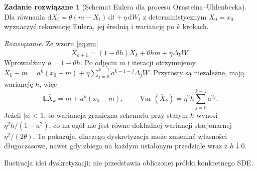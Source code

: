 \documentclass[11pt,a4paper,oneside]{report}
\numberwithin{equation}{chapter}
\theoremstyle{plain}
\theoremstyle{definition}
\newtheorem{zadanie}{Zadanie rozwiązane}[chapter]
\theoremstyle{remark}
\newcommand{\E}{\mathbb{E}}
\newcommand{\Var}{\operatorname{Var}}
\newcommand{\dd}{\mathrm{d}}
\begin{document}
\begin{zadanie}[Schemat Eulera dla procesu Ornsteina--Uhlenbecka]
Dla równania $\dd X_t=\theta(m-X_t)\,\dd t+\eta\,\dd W_t$
z deterministycznym $X_0=x_0$ wyznaczyć rekurencję
Eulera, jej średnią i wariancję po $k$ krokach.

\emph{Rozwiązanie.} Ze wzoru \eqref{eq:em}
\[
\bar X_{k+1}=(1-\theta h)\bar X_k+\theta hm
+\eta\Delta_kW.
\]
Wprowadźmy $a=1-\theta h$. Po odjęciu $m$
i iteracji otrzymujemy
$\bar X_k-m=a^k(x_0-m)+\eta\sum_{j=0}^{k-1}
a^{k-1-j}\Delta_jW$. Przyrosty są niezależne,
mają wariancję $h$, więc
\[
\E\bar X_k=m+a^k(x_0-m),\qquad
\Var(\bar X_k)=\eta^2h\sum_{j=0}^{k-1}a^{2j}.
\]
Jeżeli $|a|<1$, to wariancja graniczna schematu
przy stałym $h$ wynosi $\eta^2h/(1-a^2)$,
co na ogół nie jest równe dokładnej wariancji
stacjonarnej $\eta^2/(2\theta)$.
To pokazuje, dlaczego dyskretyzacja może zmieniać
własności długoczasowe, nawet gdy zbiega na każdym
ustalonym przedziale wraz z $h\downarrow0$.
\end{zadanie}

\begin{center}
\par\smallskip\small Ilustracja idei dyskretyzacji; nie przedstawia obliczonej próbki konkretnego SDE.
\end{center}


\end{document}
